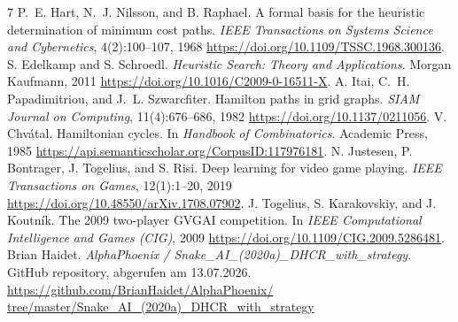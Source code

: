 \documentclass[a4paper]{scrartcl}
\begin{document}
\begin{thebibliography}{7}
 P.~E. Hart, N.~J. Nilsson, and B. Raphael. A formal basis for the heuristic determination of minimum cost paths. \textit{IEEE Transactions on Systems Science and Cybernetics}, 4(2):100--107, 1968 \href{https://doi.org/10.1109/TSSC.1968.300136}{https://doi.org/10.1109/TSSC.1968.300136}.
 S. Edelkamp and S. Schroedl. \textit{Heuristic Search: Theory and Applications}. Morgan Kaufmann, 2011 \href{https://doi.org/10.1016/C2009-0-16511-X}{https://doi.org/10.1016/C2009-0-16511-X}.
 A. Itai, C.~H. Papadimitriou, and J.~L. Szwarcfiter. Hamilton paths in grid graphs. \textit{SIAM Journal on Computing}, 11(4):676--686, 1982 \href{https://doi.org/10.1137/0211056}{https://doi.org/10.1137/0211056}.
 V. Chvátal. Hamiltonian cycles. In \textit{Handbook of Combinatorics}. Academic Press, 1985 \href{https://api.semanticscholar.org/CorpusID:117976181}{https://api.semanticscholar.org/CorpusID:117976181}.
 N. Justesen, P. Bontrager, J. Togelius, and S. Risi. Deep learning for video game playing. \textit{IEEE Transactions on Games}, 12(1):1--20, 2019 \href{https://doi.org/10.48550/arXiv.1708.07902}{https://doi.org/10.48550/arXiv.1708.07902}.
 J. Togelius, S. Karakovskiy, and J. Koutník. The 2009 two-player {GVGAI} competition. In \textit{IEEE Computational Intelligence and Games (CIG)}, 2009 \href{https://doi.org/10.1109/CIG.2009.5286481}{https://doi.org/10.1109/CIG.2009.5286481}.
 Brian Haidet. \textit{AlphaPhoenix / Snake\_AI\_(2020a)\_DHCR\_with\_strategy}. GitHub repository, abgerufen am 13.07.2026. \href{https://github.com/BrianHaidet/AlphaPhoenix/tree/master/Snake_AI_(2020a)_DHCR_with_strategy}{https://github.com/BrianHaidet/AlphaPhoenix/ tree/master/Snake\_AI\_(2020a)\_DHCR\_with\_strategy}
\end{thebibliography}
\end{document}
